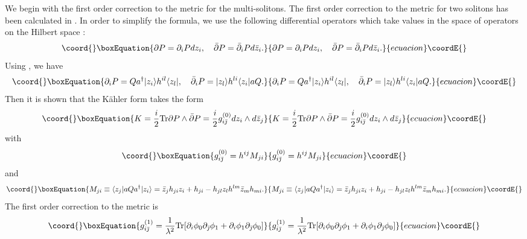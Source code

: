 \documentclass[a4paper,12pt]{article}
\begin{document}
We begin with  the first
order correction to the metric for the multi-solitons.
The first order correction to the metric for two solitons has been
calculated in \cite{HLRU}.
In order to simplify the formula, we use the following differential
operators which take values in the space of operators on the Hilbert
space \coordHE{}:
\begin{equation}\coord{}\boxEquation{
\partial P=\partial_{i}P d z_{i},\quad
\bar{\partial}P=\bar{\partial}_{i}P d\bar{z}_{i}.
}{
\partial P=\partial_{i}P d z_{i},\quad
\bar{\partial}P=\bar{\partial}_{i}P d\bar{z}_{i}.
}{ecuacion}\coordE{}\end{equation}
Using \coordHE{}, we have
\begin{equation}\coord{}\boxEquation{
 \partial_{i}P=Q a^{\dagger} |z_{i}\rangle h^{il} \langle z_{l}|,
\quad  \bar{\partial}_{i}P=|z_{l}\rangle  h^{li} \langle z_{i}|a Q.
}{
 \partial_{i}P=Q a^{\dagger} |z_{i}\rangle h^{il} \langle z_{l}|,
\quad  \bar{\partial}_{i}P=|z_{l}\rangle  h^{li} \langle z_{i}|a Q.
}{ecuacion}\coordE{}\end{equation}
Then it is shown that the K\"ahler form \coordHE{} takes the form \cite{GHS}
\begin{equation}\coord{}\boxEquation{
 K={i\over 2}{\rm Tr}\partial P\wedge \bar{\partial}P
={i\over 2}g^{(0)}_{i\bar{\jmath}}dz_{i}\wedge d\bar{z}_{j}
}{
 K={i\over 2}{\rm Tr}\partial P\wedge \bar{\partial}P
={i\over 2}g^{(0)}_{i\bar{\jmath}}dz_{i}\wedge d\bar{z}_{j}
}{ecuacion}\coordE{}\end{equation}
with
\begin{equation}\coord{}\boxEquation{
 g^{(0)}_{i\bar{\jmath}}=h^{ij} M_{ji}
\label{eq:g0a}
}{
 g^{(0)}_{i\bar{\jmath}}=h^{ij} M_{ji}
}{ecuacion}\coordE{}\end{equation}
and
\begin{equation}\coord{}\boxEquation{
 M_{ji}\equiv \langle z_{j}|aQa^{\dagger}| z_{i}\rangle
=\bar{z}_{j}h_{ji}z_{i}+h_{ji}-h_{jl}z_{l}h^{lm}\bar{z}_{m}h_{mi}.
\label{eq:M}
}{
 M_{ji}\equiv \langle z_{j}|aQa^{\dagger}| z_{i}\rangle
=\bar{z}_{j}h_{ji}z_{i}+h_{ji}-h_{jl}z_{l}h^{lm}\bar{z}_{m}h_{mi}.
}{ecuacion}\coordE{}\end{equation}
The first order correction to the metric \coordHE{} is
\begin{equation}\coord{}\boxEquation{
 g^{(1)}_{i\bar{\jmath}}={1\over\lambda^2}
{\rm Tr}[\partial_{i}\phi_{0}\partial_{\bar{\jmath}}\phi_{1}
+\partial_{i}\phi_{1}\partial_{\bar{\jmath}}\phi_{0}]
}{
 g^{(1)}_{i\bar{\jmath}}={1\over\lambda^2}
{\rm Tr}[\partial_{i}\phi_{0}\partial_{\bar{\jmath}}\phi_{1}
+\partial_{i}\phi_{1}\partial_{\bar{\jmath}}\phi_{0}]
}{ecuacion}\coordE{}\end{equation}
\end{document}
